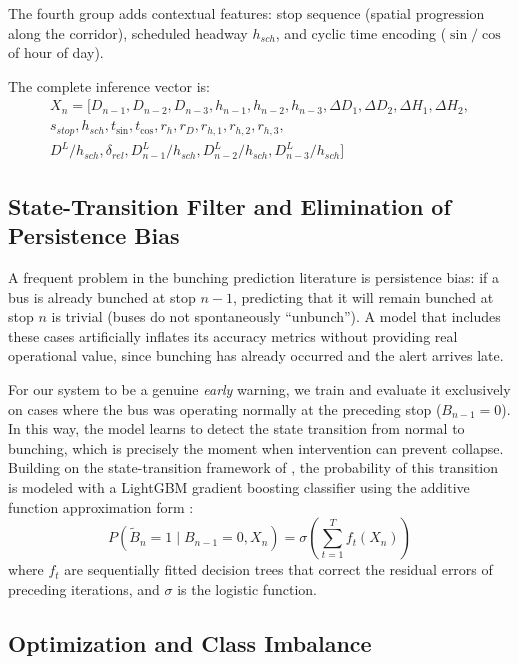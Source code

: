 \documentclass[fleqn,10pt,lineno]{wlpeerj}
\begin{document}
The fourth group adds contextual features: stop sequence (spatial progression along the corridor), scheduled headway $h_{sch}$, and cyclic time encoding ($\sin/\cos$ of hour of day).

The complete inference vector is:
\begin{multline}
  X_n = \bigl[ D_{n-1}, D_{n-2}, D_{n-3}, h_{n-1}, h_{n-2}, h_{n-3},
  \Delta D_{1}, \Delta D_{2}, \Delta H_{1}, \Delta H_{2},\\
  s_{stop}, h_{sch}, t_{\sin}, t_{\cos},
  r_h, r_D, r_{h,1}, r_{h,2}, r_{h,3},\\
  D^{L}/h_{sch}, \delta_{rel}, D^{L}_{n-1}/h_{sch}, D^{L}_{n-2}/h_{sch}, D^{L}_{n-3}/h_{sch} \bigr]
\end{multline}

\subsection{State-Transition Filter and Elimination of Persistence Bias}

A frequent problem in the bunching prediction literature is persistence bias: if a bus is
already bunched at stop $n{-}1$, predicting that it will remain bunched at stop $n$ is trivial
(buses do not spontaneously ``unbunch''). A model that includes these cases artificially inflates
its accuracy metrics without providing real operational value, since bunching has already
occurred and the alert arrives late.

For our system to be a genuine \textit{early} warning, we train and evaluate it exclusively on
cases where the bus was operating normally at the preceding stop ($B_{n-1}=0$). In this way, the
model learns to detect the state transition from normal to bunching, which is precisely the
moment when intervention can prevent collapse. Building on the state-transition framework of \citet{3}, the probability of this transition is modeled
with a LightGBM gradient boosting classifier using the additive function approximation form \citep{33}:
\begin{equation}
  P(\tilde{B}_n=1 \mid B_{n-1}=0, X_n) = \sigma\!\left(\sum_{t=1}^{T} f_t(X_n)\right)
\end{equation}
where $f_t$ are sequentially fitted decision trees that correct the residual errors of preceding iterations, and $\sigma$ is the logistic function.

\subsection{Optimization and Class Imbalance}
\end{document}
